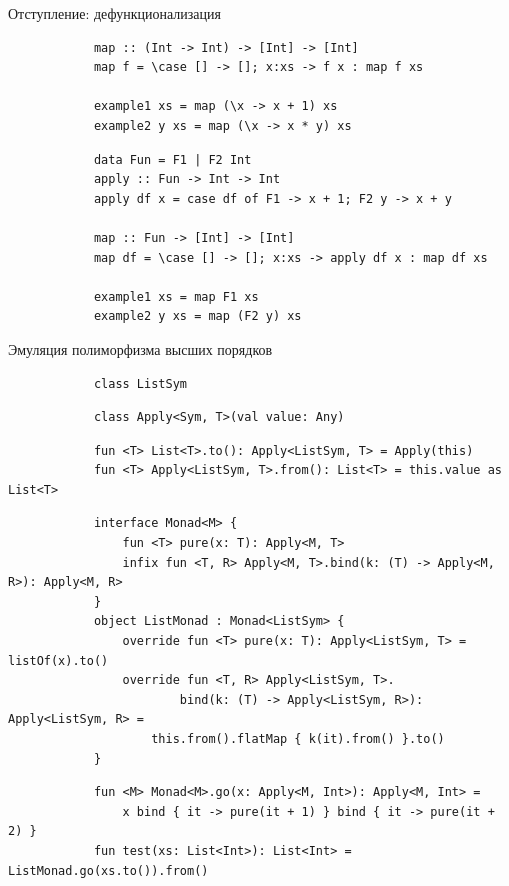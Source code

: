     \begin{frame}[fragile]{Отступление: дефункционализация}
        \pause
        \begin{verbatim}
            map :: (Int -> Int) -> [Int] -> [Int]
            map f = \case [] -> []; x:xs -> f x : map f xs

            example1 xs = map (\x -> x + 1) xs
            example2 y xs = map (\x -> x * y) xs
        \end{verbatim}
        \pause\vspace{1em}
        \begin{verbatim}
            data Fun = F1 | F2 Int
            apply :: Fun -> Int -> Int
            apply df x = case df of F1 -> x + 1; F2 y -> x + y

            map :: Fun -> [Int] -> [Int]
            map df = \case [] -> []; x:xs -> apply df x : map df xs

            example1 xs = map F1 xs
            example2 y xs = map (F2 y) xs
        \end{verbatim}
    \end{frame}

    \begin{frame}[fragile]{Эмуляция полиморфизма высших порядков}
        \pause
        \begin{verbatim}
            class ListSym
        \end{verbatim}
        \pause
        \begin{verbatim}
            class Apply<Sym, T>(val value: Any)
        \end{verbatim}
        \pause
        \begin{verbatim}
            fun <T> List<T>.to(): Apply<ListSym, T> = Apply(this)
            fun <T> Apply<ListSym, T>.from(): List<T> = this.value as List<T>
        \end{verbatim}
        \pause
        \begin{verbatim}
            interface Monad<M> {
                fun <T> pure(x: T): Apply<M, T>
                infix fun <T, R> Apply<M, T>.bind(k: (T) -> Apply<M, R>): Apply<M, R>
            }
            object ListMonad : Monad<ListSym> {
                override fun <T> pure(x: T): Apply<ListSym, T> = listOf(x).to()
                override fun <T, R> Apply<ListSym, T>.
                        bind(k: (T) -> Apply<ListSym, R>): Apply<ListSym, R> =
                    this.from().flatMap { k(it).from() }.to()
            }
        \end{verbatim}
        \pause
        \begin{verbatim}
            fun <M> Monad<M>.go(x: Apply<M, Int>): Apply<M, Int> =
                x bind { it -> pure(it + 1) } bind { it -> pure(it + 2) }
            fun test(xs: List<Int>): List<Int> = ListMonad.go(xs.to()).from()
        \end{verbatim}
    \end{frame}

